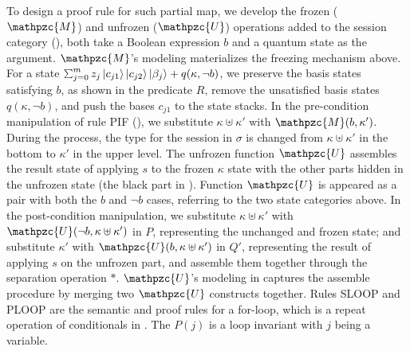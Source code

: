 To design a proof rule for such partial map, we develop the frozen ($\mathpzc{M}$) and unfrozen ($\mathpzc{U}$) operations added to the session category (), both take a Boolean expression $b$ and a quantum state as the argument. $\mathpzc{M}$'s modeling materializes the freezing mechanism above. For a state $\scha{m}{z_j}{c_{j1}}{\ket{c_{j2}}\ket{\beta_j}}+q(\kappa,\neg b)$, we preserve the basis states satisfying $b$, as shown in the predicate $R$, remove the unsatisfied basis states $q(\kappa,\neg b)$, and push the bases $c_{j1}$ to the state stacks.
In the pre-condition manipulation of rule \textsc{PIF} (), we substitute $\kappa \uplus \kappa'$ with $\mathpzc{M}(b,\kappa')$. During the process, the type for the session in $\sigma$ is changed from $\kappa \uplus \kappa'$ in the bottom to $\kappa'$ in the upper level.
The unfrozen function $\mathpzc{U}$ assembles the result state of applying $s$ to the frozen $\kappa$ state with the other parts hidden in the unfrozen state (the black part in ). Function $\mathpzc{U}$ is appeared as a pair with both the $b$ and $\neg b$ cases, referring to the two state categories above. In the post-condition manipulation, we substitute $\kappa \uplus \kappa'$ with $\mathpzc{U}(\neg b,\kappa \uplus \kappa')$ in $P$, representing the unchanged and frozen state; and substitute $\kappa'$ with $\mathpzc{U}(b,\kappa \uplus \kappa')$ in $Q'$, representing the result of applying $s$ on the unfrozen part, and assemble them together through the separation operation $*$.
$\mathpzc{U}$'s modeling in  captures the assemble procedure by merging two $\mathpzc{U}$ constructs together.
Rules \textsc{SLOOP} and \textsc{PLOOP} are the semantic and proof rules for a for-loop, which is a repeat operation of conditionals in \qafny. The $P(j)$ is a loop invariant with $j$ being a variable.


